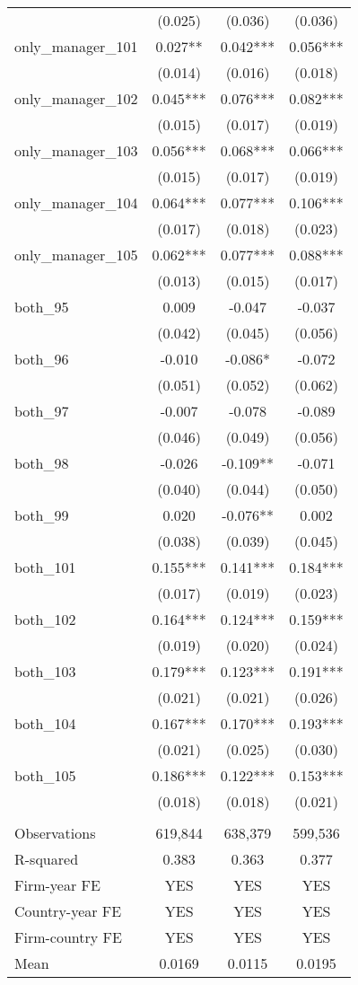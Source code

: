 \begin{tabular}{lccc}
 & (0.025) & (0.036) & (0.036) \\
only\_manager\_101 & 0.027** & 0.042*** & 0.056*** \\
 & (0.014) & (0.016) & (0.018) \\
only\_manager\_102 & 0.045*** & 0.076*** & 0.082*** \\
 & (0.015) & (0.017) & (0.019) \\
only\_manager\_103 & 0.056*** & 0.068*** & 0.066*** \\
 & (0.015) & (0.017) & (0.019) \\
only\_manager\_104 & 0.064*** & 0.077*** & 0.106*** \\
 & (0.017) & (0.018) & (0.023) \\
only\_manager\_105 & 0.062*** & 0.077*** & 0.088*** \\
 & (0.013) & (0.015) & (0.017) \\
both\_95 & 0.009 & -0.047 & -0.037 \\
 & (0.042) & (0.045) & (0.056) \\
both\_96 & -0.010 & -0.086* & -0.072 \\
 & (0.051) & (0.052) & (0.062) \\
both\_97 & -0.007 & -0.078 & -0.089 \\
 & (0.046) & (0.049) & (0.056) \\
both\_98 & -0.026 & -0.109** & -0.071 \\
 & (0.040) & (0.044) & (0.050) \\
both\_99 & 0.020 & -0.076** & 0.002 \\
 & (0.038) & (0.039) & (0.045) \\
both\_101 & 0.155*** & 0.141*** & 0.184*** \\
 & (0.017) & (0.019) & (0.023) \\
both\_102 & 0.164*** & 0.124*** & 0.159*** \\
 & (0.019) & (0.020) & (0.024) \\
both\_103 & 0.179*** & 0.123*** & 0.191*** \\
 & (0.021) & (0.021) & (0.026) \\
both\_104 & 0.167*** & 0.170*** & 0.193*** \\
 & (0.021) & (0.025) & (0.030) \\
both\_105 & 0.186*** & 0.122*** & 0.153*** \\
 & (0.018) & (0.018) & (0.021) \\
 &  &  &  \\
Observations & 619,844 & 638,379 & 599,536 \\
R-squared & 0.383 & 0.363 & 0.377 \\
Firm-year FE & YES & YES & YES \\
Country-year FE & YES & YES & YES \\
Firm-country FE & YES & YES & YES \\
 Mean & 0.0169 & 0.0115 & 0.0195 \\ \hline
\end{tabular}
